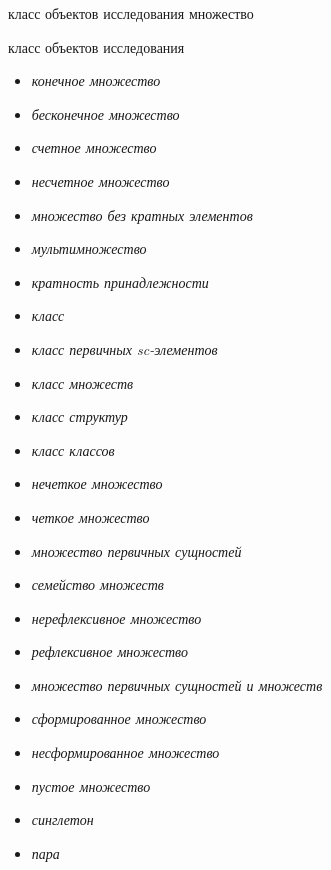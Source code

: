 \begin{SCn}
\scnsectionheader{\currentname}
\begin{scnsubstruct}
\begin{scnhaselementrole}{класс объектов исследования}
множество
\end{scnhaselementrole}
\begin{scnhaselementrolelist}{класс объектов исследования}
\begin{itemize}
    \item\textit{конечное множество}
    \item\textit{бесконечное множество}
    \item\textit{счетное множество}
    \item\textit{несчетное множество}
    \item\textit{множество без кратных элементов}
    \item\textit{мультимножество}
    \item\textit{кратность принадлежности}
    \item\textit{класс}
    \item\textit{класс первичных sc-элементов}
    \item\textit{класс множеств}
    \item\textit{класс структур}
    \item\textit{класс классов}
    \item\textit{нечеткое множество}
    \item\textit{четкое множество}
    \item\textit{множество первичных сущностей}
    \item\textit{семейство множеств}
    \item\textit{нерефлексивное множество}
    \item\textit{рефлексивное множество}
    \item\textit{множество первичных сущностей и множеств}
    \item\textit{сформированное множество}
    \item\textit{несформированное множество}
    \item\textit{пустое множество}
    \item\textit{синглетон}
    \item\textit{пара}

\end{itemize}
\end{scnhaselementrolelist}
\end{scnsubstruct}
\end{SCn}
